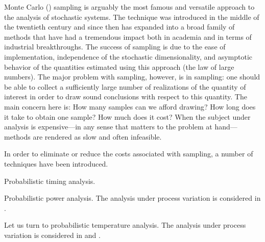 Monte Carlo () sampling \cite{xiu2010} is arguably the most famous and
versatile approach to the analysis of stochastic systems. The technique was
introduced in the middle of the twentieth century and since then has expanded
into a broad family of methods that have had a tremendous impact both in
academia and in terms of industrial breakthroughs. The success of 
sampling is due to the ease of implementation, independence of the stochastic
dimensionality, and asymptotic behavior of the quantities estimated using this
approach (the law of large numbers). The major problem with  sampling,
however, is in sampling: one should be able to collect a sufficiently large
number of realizations of the quantity of interest in order to draw sound
conclusions with respect to this quantity. The main concern here is: How many
samples can we afford drawing? How long does it take to obtain one sample? How
much does it cost? When the subject under analysis is expensive---in any sense
that matters to the problem at hand--- methods are rendered as slow and
often infeasible.

In order to eliminate or reduce the costs associated with  sampling, a
number of techniques have been introduced.

Probabilistic timing analysis.

Probabilistic power analysis. The analysis under process variation is considered
in \cite{ukhov2014}.

Let us turn to probabilistic temperature analysis. The analysis under process
variation is considered in \cite{ukhov2014} and \cite{ukhov2015}.
